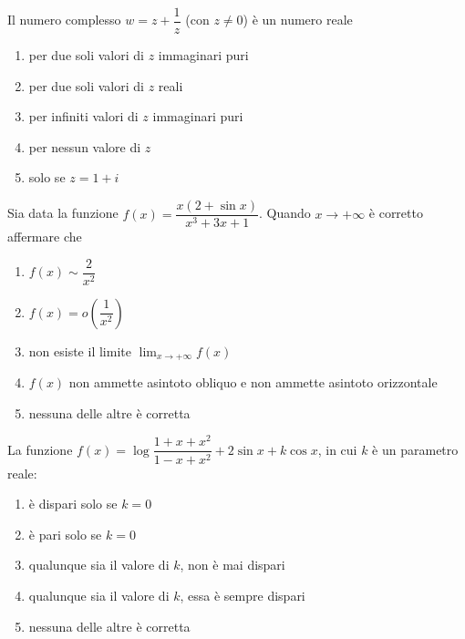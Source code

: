 \begin{quiz}
Il numero complesso $w=z+\dfrac1z$ (con $z\ne0$) \`e un numero reale
\begin{enumerate}
\item per due soli valori di $z$ immaginari puri
\item per due soli valori di $z$ reali
\item per infiniti valori di $z$ immaginari puri
\item per nessun valore di $z$
\item solo se $z=1+i$
\end{enumerate}
\end{quiz}

\begin{quiz}
Sia data la funzione $f(x)=\dfrac{x(2+\sin x)}{x^3+3x+1}$. Quando $x\to+\infty$ \`e corretto affermare che
\begin{enumerate}
\item $f(x)\sim\dfrac2{x^2}$
\item $f(x)=o\left(\dfrac1{x^2}\right)$
\item non esiste il limite $\lim_{x\to+\infty}f(x)$
\item $f(x)$ non ammette asintoto obliquo e non ammette asintoto orizzontale
\item nessuna delle altre \`e corretta
\end{enumerate}
\end{quiz}

\begin{quiz}
La funzione $f(x)=\log\dfrac{1+x+x^2}{1-x+x^2}+2\sin x+k\cos x$, in cui $k$ \`e un parametro reale:
\begin{enumerate}
\item \`e dispari solo se $k=0$
\item \`e pari solo se $k=0$
\item qualunque sia il valore di $k$, non \`e mai dispari
\item qualunque sia il valore di $k$, essa \`e sempre dispari
\item nessuna delle altre \`e corretta
\end{enumerate}
\end{quiz}

